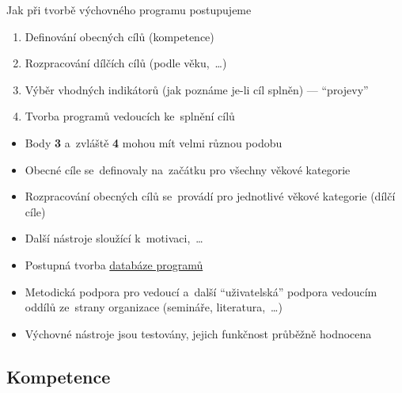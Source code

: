 \documentclass[compress, xelatex, 11pt, xcolor=dvipsnames, aspectratio=169, url={hyphens, lowtilde}]{beamer}
\begin{document}
\begin{frame}{Jak při tvorbě výchovného programu postupujeme}
	\begin{enumerate}
		\item Definování obecných cílů (kompetence)
		\item Rozpracování dílčích cílů (podle věku,~\ldots)
		\item Výběr vhodných indikátorů (jak poznáme je-li cíl splněn) --- \enquote{projevy}
		\item Tvorba programů vedoucích ke~splnění cílů
	\end{enumerate}
	\begin{itemize}
		\item Body \textbf{3} a~zvláště \textbf{4} mohou mít velmi různou podobu
		\item Obecné cíle se~definovaly na~začátku pro všechny věkové kategorie
		\item Rozpracování obecných cílů se~provádí pro jednotlivé věkové kategorie (dílčí cíle)
		\item Další nástroje sloužící k~motivaci,~\ldots
		\item Postupná tvorba \href{https://chystamprogram.skaut.cz/}{databáze programů}
		\item Metodická podpora pro vedoucí a~další \enquote{uživatelská} podpora vedoucím oddílů ze~strany organizace (semináře, literatura,~\ldots)
		\item Výchovné nástroje jsou testovány, jejich funkčnost průběžně hodnocena
	\end{itemize}
\end{frame}

\subsection{Kompetence}
\end{document}
